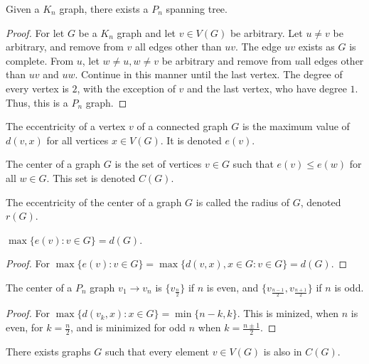         \begin{theorem}
        Given a $K_n$ graph, there exists a $P_n$ spanning tree.
        \end{theorem}
        \begin{proof}
        For let $G$ be a $K_n$ graph and let $v\in V(G)$ be arbitrary. Let $u\ne v$ be arbitrary, and remove from $v$ all edges other than $uv$. The edge $uv$ exists as $G$ is complete. From $u$, let $w\ne u, w\ne v$ be arbitrary and remove from $u$all edges other than $uv$ and $uw$. Continue in this manner until the last vertex. The degree of every vertex is $2$, with the exception of $v$ and the last vertex, who have degree $1$. Thus, this is a $P_n$ graph.
        \end{proof}
        \begin{definition}
        The eccentricity of a vertex $v$ of a connected graph $G$ is the maximum value of $d(v,x)$ for all vertices $x\in V(G)$. It is denoted $e(v)$.
        \end{definition}
        \begin{definition}
        The center of a graph $G$ is the set of vertices $v\in G$ such that $e(v) \leq e(w)$ for all $w\in G$. This set is denoted $C(G)$.
        \end{definition}
        \begin{definition}
        The eccentricity of the center of a graph $G$ is called the radius of $G$, denoted $r(G)$.
        \end{definition}
        \begin{corollary}
        $\max\{e(v):v\in G\}= d(G)$.
        \end{corollary}
        \begin{proof}
        For $\max\{e(v):v\in G\} = \max\{d(v,x), x\in G:v\in G\} = d(G)$.
        \end{proof}
        \begin{corollary}
        The center of a $P_n$ graph $v_1\rightarrow v_n$ is $\{v_\frac{n}{2}\}$ if $n$ is even, and $\{v_{\frac{n-1}{2}},v_{\frac{n+1}{2}}\}$ if $n$ is odd.
        \end{corollary}
        \begin{proof}
        For $\max\{d(v_k,x):x\in G\} = \min\{n-k,k\}$. This is minized, when $n$ is even, for $k= \frac{n}{2}$, and is minimized for odd $n$ when $k=\frac{n\pm 1}{2}$.
        \end{proof}
        \begin{corollary}
        There exists graphs $G$ such that every element $v\in V(G)$ is also in $C(G)$.
        \end{corollary}

